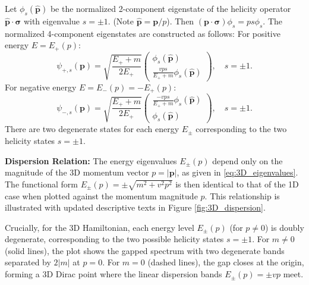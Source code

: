 \documentclass[11pt]{article}
\begin{document}
Let $\phi_s(\hat{\mathbf{p}})$ be the normalized 2-component eigenstate of the helicity operator $\hat{\mathbf{p}} \cdot \bm{\sigma}$ with eigenvalue $s = \pm 1$. (Note $\hat{\mathbf{p}} = \mathbf{p}/p$). Then $(\mathbf{p} \cdot \bm{\sigma}) \phi_s = p s \phi_s$.
The normalized 4-component eigenstates are constructed as follows:
For positive energy $E = E_+(p)$:
\begin{equation}
\psi_{+, s}(\mathbf{p}) = \sqrt{\frac{E_+ + m}{2 E_+}} \begin{pmatrix} \phi_s(\hat{\mathbf{p}}) \\ \frac{v p s}{E_+ + m} \phi_s(\hat{\mathbf{p}}) \end{pmatrix}, \quad s = \pm 1.
\label{eq:3D_eigenstate_plus}
\end{equation}
For negative energy $E = E_-(p) = -E_+(p)$:
\begin{equation}
\psi_{-, s}(\mathbf{p}) = \sqrt{\frac{E_+ + m}{2 E_+}} \begin{pmatrix} \frac{-v p s}{E_+ + m} \phi_s(\hat{\mathbf{p}}) \\ \phi_s(\hat{\mathbf{p}}) \end{pmatrix}, \quad s = \pm 1.
\label{eq:3D_eigenstate_minus}
\end{equation}
There are two degenerate states for each energy $E_{\pm}$ corresponding to the two helicity states $s = \pm 1$.

\textbf{Dispersion Relation:}
The energy eigenvalues $E_{\pm}(p)$ depend only on the magnitude of the 3D momentum vector $p=|\mathbf{p}|$, as given in \eqref{eq:3D_eigenvalues}. The functional form $E_{\pm}(p) = \pm \sqrt{m^2 + v^2 p^2}$ is then identical to that of the 1D case when plotted against the momentum magnitude $p$. This relationship is illustrated with updated descriptive texts in Figure \ref{fig:3D_dispersion}.

Crucially, for the 3D Hamiltonian, each energy level $E_{\pm}(p)$ (for $p \neq 0$) is doubly degenerate, corresponding to the two possible helicity states $s=\pm 1$. For $m \neq 0$ (solid lines), the plot shows the gapped spectrum with two degenerate bands separated by $2|m|$ at $p=0$. For $m=0$ (dashed lines), the gap closes at the origin, forming a 3D Dirac point where the linear dispersion bands $E_{\pm}(p) = \pm v p$ meet.
\end{document}
